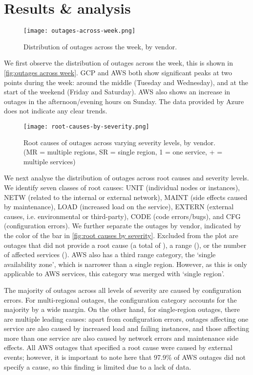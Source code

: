 \section{Results \& analysis}
\begin{figure}[h]
  \centering
  \texttt{[image: outages-across-week.png]}
  \caption{Distribution of outages across the week, by vendor.}
  \label{fig:outages across week}
\end{figure}

We first observe the distribution of outages across the week, this is shown in \autoref{fig:outages across week}.
GCP and AWS both show significant peaks at two points during the week: around the middle (Tuesday and Wednesday), and at the start of the weekend (Friday and Saturday).
AWS also shows an increase in outages in the afternoon/evening hours on Sunday.
The data provided by Azure does not indicate any clear trends.

\begin{figure}[h]
  \centering
  \texttt{[image: root-causes-by-severity.png]}
  \caption{Root causes of outages across varying severity levels, by vendor. (MR = multiple regions, SR = single region, 1 = one service, + = multiple services)}
  \label{fig:root causes by severity}
\end{figure}

We next analyse the distribution of outages across root causes and severity levels.
We identify seven classes of root causes: UNIT (individual nodes or instances), NETW (related to the internal or external network), MAINT (side effects caused by maintenance), LOAD (increased load on the service), EXTERN (external causes, i.e. environmental or third-party), CODE (code errors/bugs), and CFG (configuration errors).
We further separate the outages by vendor, indicated by the color of the bar in \autoref{fig:root causes by severity}.
Excluded from the plot are outages that did not provide a root cause (a total of ), a range (), or the number of affected services ().
AWS also has a third range category, the `single availability zone', which is narrower than a single region. %
However, as this is only applicable to AWS services, this category was merged with `single region'.

The majority of outages across all levels of severity are caused by configuration errors.
For multi-regional outages, the configuration category accounts for the majority by a wide margin.
On the other hand, for single-region outages, there are multiple leading causes: apart from configuration errors, outages affecting one service are also caused by increased load and failing instances, and those affecting more than one service are also caused by network errors and maintenance side effects.
All AWS outages that specified a root cause were caused by external events; however, it is important to note here that 97.9\% of AWS outages did not specify a cause, so this finding is limited due to a lack of data.

